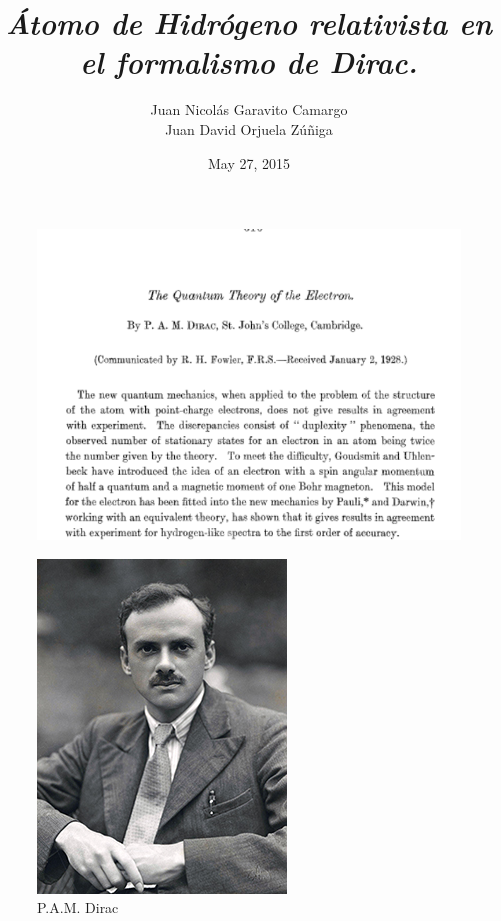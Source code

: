 \documentclass{beamer}
\title{\textit{\textbf{\'Atomo de Hidr\'ogeno relativista en el formalismo de Dirac.}}}
\author{Juan Nicol\'as Garavito Camargo \\ Juan David Orjuela Z\'u\~niga}
\institute{Universidad de los Andes, Bogot\'a, Colombia}
\date{May 27, 2015}
\begin{document}


\begin{frame}
\begin{figure}
\includegraphics[scale=0.4]{Figures/dirac1928.png}
\end{figure}
\end{frame}


\begin{frame}
\begin{figure}
\includegraphics[scale=0.5]{Figures/dirac.jpg}
\caption{P.A.M. Dirac}
\end{figure}
\end{frame}
\end{document}
